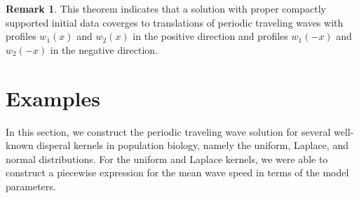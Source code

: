 \documentclass[11pt]{article}
\theoremstyle{definition}
\newtheorem{rem}[thm]{Remark}
\numberwithin{equation}{section}
\numberwithin{thm}{section}
\begin{document}
\begin{rem}
This theorem indicates that a solution with proper compactly supported initial data coverges to translations of periodic traveling waves with profiles $w_1(x)$ and $w_2(x)$ in the positive direction and profiles $w_1(-x)$ and $w_2(-x)$ in the negative direction.
\end{rem}

\section{Examples}

In this section, we construct the periodic traveling wave solution for several well-known disperal kernels in population biology, namely the uniform, Laplace, and normal distributions. For the uniform and Laplace kernels, we were able to construct a piecewise expression for the mean wave speed in terms of the model parameters. 
\end{document}
